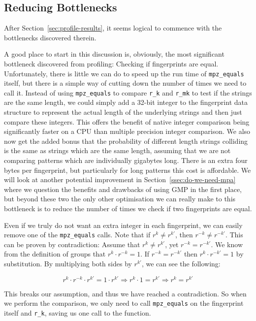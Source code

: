 \documentclass[ %
                    author={Dominic Joseph Moylett},
                    degree={MEng},
                     title={Dictionary Matching with Fingerprints},
                  subtitle={An Empirical Analysis},
                      type={research},
                      year={2015} ]{dissertation}
\begin{document}
\subsection{Reducing Bottlenecks}
\label{ssec:reduce-bottle}

After Section~\ref{sec:profile-results}, it seems logical to commence with the bottlenecks discovered therein.

A good place to start in this discussion is, obviously, the most significant bottleneck discovered from profiling: Checking if fingerprints are equal. Unfortunately, there is little we can do to speed up the run time of \texttt{mpz\_equals} itself, but there is a simple way of cutting down the number of times we need to call it. Instead of using \texttt{mpz\_equals} to compare \texttt{r\_k} and \texttt{r\_mk} to test if the strings are the same length, we could simply add a 32-bit integer to the fingerprint data structure to represent the actual length of the underlying strings and then just compare these integers. This offers the benefit of native integer comparison being significantly faster on a CPU than multiple precision integer comparison. We also now get the added bonus that the probability of different length strings colliding is the same as strings which are the same length, assuming that we are not comparing patterns which are individually gigabytes long. There is an extra four bytes per fingerprint, but particularly for long patterns this cost is affordable. We will look at another potential improvement in Section~\ref{ssec:do-we-need-mpa} where we question the benefits and drawbacks of using GMP in the first place, but beyond these two the only other optimisation we can really make to this bottleneck is to reduce the number of times we check if two fingerprints are equal.

Even if we truly do not want an extra integer in each fingerprint, we can easily remove one of the \texttt{mpz\_equals} calls. Note that if $r^k \neq r^{k'}$, then $r^{-k} \neq r^{-k'}$. This can be proven by contradiction: Assume that $r^k \neq r^{k'}$, yet $r^{-k} = r^{-k'}$. We know from the definition of groups \cite[p 250]{katz} that $r^k \cdot r^{-k} = 1$. If $r^{-k} = r^{-k'}$ then $r^k \cdot r^{-k'} = 1$ by substitution. By multiplying both sides by $r^{k'}$, we can see the following:

$$r^k \cdot r^{-k} \cdot r^{k'} = 1 \cdot r^{k'} \Rightarrow r^k \cdot 1 = r^{k'} \Rightarrow r^k = r^{k'}$$

This breaks our assumption, and thus we have reached a contradiction. So when we perform the comparison, we only need to call \texttt{mpz\_equals} on the fingerprint itself and \texttt{r\_k}, saving us one call to the function.
\end{document}
